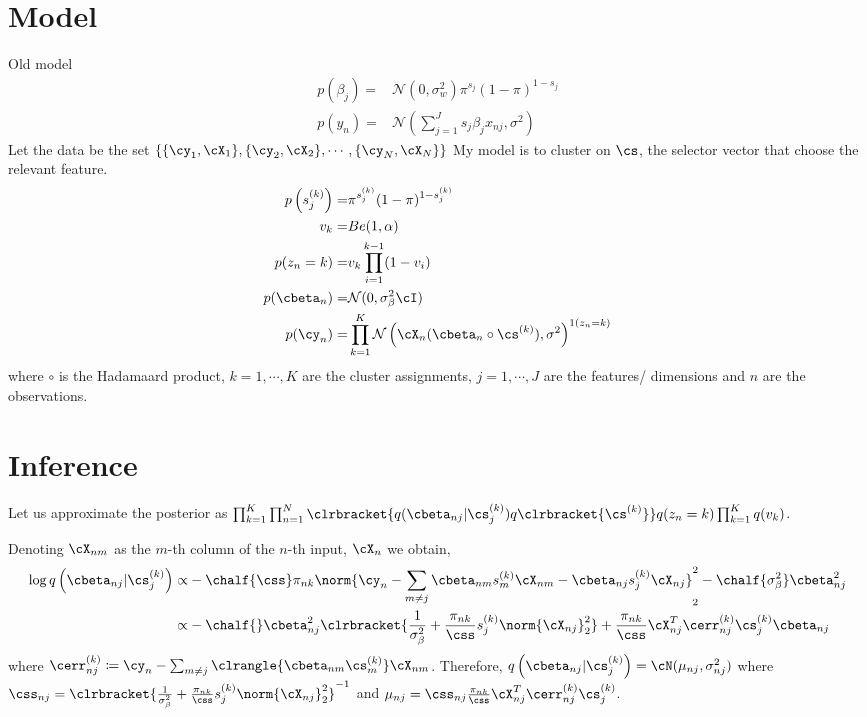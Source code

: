 \documentclass{article}
\begin{document}
\section{Model}
Old model
\begin{align}
\nonumber p(\beta_j)=&\mathcal{N}(0,\sigma_{w}^2)\pi^{s_j}(1-\pi)^{1-s_j}\\
\nonumber p(y_n)=&\mathcal{N}\left(\sum_{j=1}^{J}s_j\beta_jx_{nj},\sigma^2\right)
\end{align}
Let the data be the set $\{\{\cy_1,\cX_1\},\{\cy_2,\cX_2\},\cdots,\{\cy_N,\cX_N\}\}$
My model is to cluster on $\cs$, the selector vector that choose the relevant feature.
\begin{align}
p\left(s_j^{(k)}\right)=&\pi^{s_j^{(k)}}(1-\pi)^{1-s_j^{(k)}}\\
v_k=& Be(1,\alpha)\\
p(z_n=k)=& v_k\prod_{i=1}^{k-1}(1-v_i)\\
p(\cbeta_n)=&\mathcal{N}(0,\sigma_{\beta}^2\cI)\\
p(\cy_n)=&\prod_{k=1}^{K}\mathcal{N}\left(\cX_n(\cbeta_n\circ\cs^{(k)}),\sigma^2\right)^{1(z_n=k)}
\end{align}
where $\circ$ is the Hadamaard product, $k=1,\cdots,K$ are the cluster assignments, $j=1,\cdots,J$ are the features/ dimensions and $n$ are the observations.

\section{Inference}
Let us approximate the posterior as $\prod_{k=1}^{K}\prod_{n=1}^{N}\clrbracket{q(\cbeta_{nj}|\cs_j^{(k)})q\clrbracket{\cs^{(k)}}}q(z_n=k)\prod_{k=1}^{K}q(v_k)$.

Denoting $\cX_{nm}$ as the $m$-th column of the $n$-th input, $\cX_n$ we obtain,
\begin{align}
\nonumber \log q\left(\cbeta_{nj}|\cs_j^{(k)}\right)\propto &-\chalf{\css}\pi_{nk}\norm{\cy_n-\sum_{m\ne j}\cbeta_{nm}s_m^{(k)}\cX_{nm}-\cbeta_{nj}s_j^{(k)}\cX_{nj}}_2^2-\chalf{\sigma_\beta^2}\cbeta_{nj}^2\\
\nonumber \propto &-\chalf{}\cbeta_{nj}^2\clrbracket{\frac{1}{\sigma_\beta^2}+\frac{\pi_{nk}}{\css}s_j^{(k)}\norm{\cX_{nj}}_2^2}+\frac{\pi_{nk}}{\css}\cX_{nj}^T\cerr_{nj}^{(k)}\cs_j^{(k)}\cbeta_{nj}
\end{align}
where $\cerr_{nj}^{(k)}\coloneqq\cy_n-\sum_{m\ne j}\clrangle{\cbeta_{nm}\cs_m^{(k)}}\cX_{nm}$. Therefore, $q\left(\cbeta_{nj}|\cs_j^{(k)}\right)=\cN(\mu_{nj},\sigma_{nj}^2)$ where $\css_{nj}=\clrbracket{\frac{1}{\sigma_\beta^2}+\frac{\pi_{nk}}{\css}s_j^{(k)}\norm{\cX_{nj}}_2^2}^{-1}$ and $\mu_{nj}=\css_{nj}\frac{\pi_{nk}}{\css}\cX_{nj}^T\cerr_{nj}^{(k)}\cs_j^{(k)}$.
\end{document}

